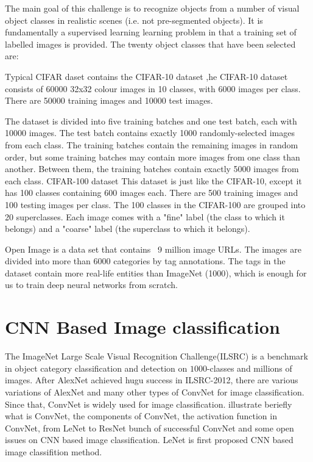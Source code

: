 \documentclass[10pt,twocolumn,letterpaper]{article}
\begin{document}
The main goal of this challenge is to recognize objects from a number of visual object classes in realistic scenes (i.e. not pre-segmented objects). It is fundamentally a supervised learning learning problem in that a training set of labelled images is provided. The twenty object classes that have been selected are: 

Typical CIFAR daset contains  the  CIFAR-10 dataset ,he CIFAR-10 dataset consists of 60000 32x32 colour images in 10 classes, with 6000 images per class. There are 50000 training images and 10000 test images.

The dataset is divided into five training batches and one test batch, each with 10000 images. The test batch contains exactly 1000 randomly-selected images from each class. The training batches contain the remaining images in random order, but some training batches may contain more images from one class than another. Between them, the training batches contain exactly 5000 images from each class.
CIFAR-100 dataset
This dataset is just like the CIFAR-10, except it has 100 classes containing 600 images each. There are 500 training images and 100 testing images per class. The 100 classes in the CIFAR-100 are grouped into 20 superclasses. Each image comes with a "fine" label (the class to which it belongs) and a "coarse" label (the superclass to which it belongs).

Open Image is a data set that contains ~9 million image URLs. The images are divided into more than 6000 categories by tag annotations. The tags in the dataset contain more real-life entities than ImageNet (1000), which is enough for us to train deep neural networks from scratch.


\section{CNN Based Image classification}

\par
The ImageNet Large Scale Visual Recognition Challenge(ILSRC) is a benchmark in object category classification and detection on $1000$-classes and millions of images. After AlexNet achieved hugu success in ILSRC-2012, there are various variations of AlexNet\cite{krizhevsky2012imagenet} and many other types of ConvNet for image classification. Since that, ConvNet is widely used for image classification. \cite{aloysius2017review} illustrate beriefly what is ConvNet, the components of ConvNet, the activation function in ConvNet, from LeNet to ResNet bunch of successful ConvNet and some open issues on CNN based image classification. LeNet is first proposed CNN based image classifition method.
\end{document}

